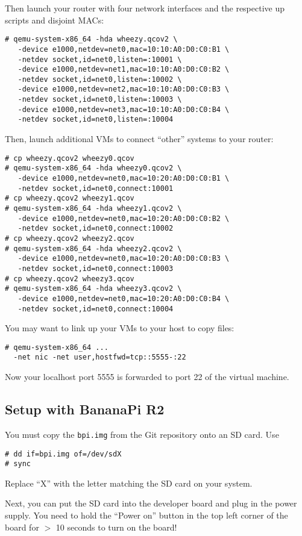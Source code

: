 \documentclass{article}
\begin{document}
Then launch your router with four network interfaces and
the respective up scripts and disjoint MACs:
\begin{verbatim}
# qemu-system-x86_64 -hda wheezy.qcov2 \
   -device e1000,netdev=net0,mac=10:10:A0:D0:C0:B1 \
   -netdev socket,id=net0,listen=:10001 \
   -device e1000,netdev=net1,mac=10:10:A0:D0:C0:B2 \
   -netdev socket,id=net0,listen=:10002 \
   -device e1000,netdev=net2,mac=10:10:A0:D0:C0:B3 \
   -netdev socket,id=net0,listen=:10003 \
   -device e1000,netdev=net3,mac=10:10:A0:D0:C0:B4 \
   -netdev socket,id=net0,listen=:10004 
\end{verbatim}
Then, launch additional VMs to connect ``other'' systems
to your router:
\begin{verbatim}
# cp wheezy.qcov2 wheezy0.qcov
# qemu-system-x86_64 -hda wheezy0.qcov2 \
   -device e1000,netdev=net0,mac=10:20:A0:D0:C0:B1 \
   -netdev socket,id=net0,connect:10001
# cp wheezy.qcov2 wheezy1.qcov
# qemu-system-x86_64 -hda wheezy1.qcov2 \
   -device e1000,netdev=net0,mac=10:20:A0:D0:C0:B2 \
   -netdev socket,id=net0,connect:10002
# cp wheezy.qcov2 wheezy2.qcov
# qemu-system-x86_64 -hda wheezy2.qcov2 \
   -device e1000,netdev=net0,mac=10:20:A0:D0:C0:B3 \
   -netdev socket,id=net0,connect:10003
# cp wheezy.qcov2 wheezy3.qcov
# qemu-system-x86_64 -hda wheezy3.qcov2 \
   -device e1000,netdev=net0,mac=10:20:A0:D0:C0:B4 \
   -netdev socket,id=net0,connect:10004
\end{verbatim}
You may want to link up your VMs to your host to copy files:
\begin{verbatim}
# qemu-system-x86_64 ...
  -net nic -net user,hostfwd=tcp::5555-:22
\end{verbatim}
Now your localhost port 5555 is forwarded to port 22 of the
virtual machine.

\subsection{Setup with BananaPi R2}

You must copy the {\tt bpi.img} from the Git repository onto an SD card.
Use
\begin{verbatim}
# dd if=bpi.img of=/dev/sdX
# sync
\end{verbatim}
Replace ``X'' with the letter matching the SD card on your system.

Next, you can put the SD card into the developer board and plug in
the power supply.  You need to hold the ``Power on'' button in the
top left corner of the board for $>$ 10 seconds to turn on the board!
\end{document}
